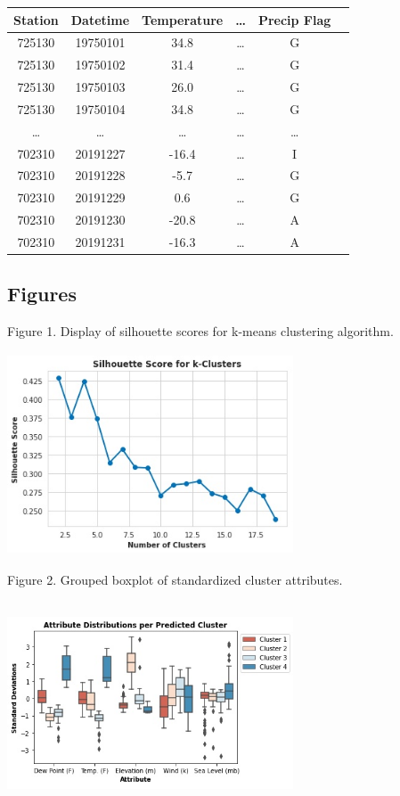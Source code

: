 \documentclass[conference]{IEEEtran}
\begin{document}
\begin{table}[h!]
\centering
 \begin{tabular}{||c c c c c c||}
 \hline
  Station& Datetime &Temperature & \dots & Precip Flag \\ [0.5ex]
 \hline\hline
 725130 & 19750101 & 34.8 & \dots & G \\
 725130 & 19750102 & 31.4 & \dots & G \\
 725130 & 19750103 & 26.0 & \dots & G \\
 725130 & 19750104 & 34.8 & \dots & G \\
 \dots & \dots & \dots & \dots & \dots \\
 702310 & 20191227 & -16.4 & \dots & I \\
 702310 & 20191228 & -5.7 & \dots & G \\
 702310 & 20191229 & 0.6 & \dots & G \\
 702310 & 20191230 & -20.8 & \dots & A \\
 702310 & 20191231 & -16.3 & \dots & A \\[1ex]

 \hline
 \end{tabular}
\end{table}

\subsection{Figures}

Figure 1. Display of silhouette scores for k-means clustering algorithm.

\includegraphics[width=8.5cm, height=6cm]{silhouette_scores.jpg}

Figure 2. Grouped boxplot of standardized cluster attributes.

\includegraphics[width=8.5cm, height=6cm]{attribute_distribution.jpg}
\end{document}
